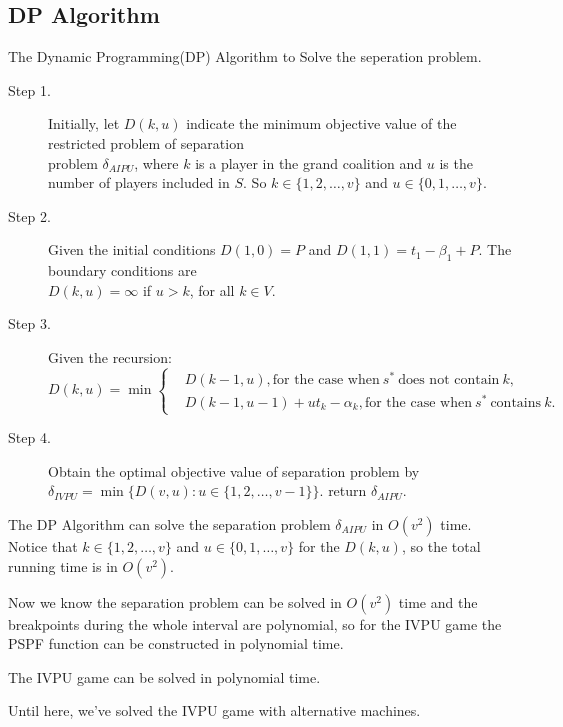 \subsection{DP Algorithm}

\begin{algorithm}[H]\label{algoDP}
\caption{The Dynamic Programming(DP) Algorithm to Solve the seperation problem.}
\begin{algorithmic}[1]

\begin{description}
  \item[Step 1.] Initially, let $D(k,u)$ indicate the minimum objective value of the restricted problem of separation \\
  \vspace{10pt}
  problem $\delta_{AIPU}$, where $k$ is a player in the grand coalition and $u$ is the number of players included in $S$. So $ k \in \{1,2,\ldots,v\}$ and $u\in \{0,1,\ldots,v\}$.

  \item[Step 2.] Given the initial conditions $D(1,0) = P$ and $D(1,1) = t_1 - \beta_1 +P$. The boundary conditions are \\
  \vspace{10pt}
  $D(k,u) = \infty$ if $u > k$, for all $k \in V$.
  \item[Step 3.] Given the recursion:
  \begin{equation*}
  D(k,u)= \min \left\{
  \begin{aligned}
  & D(k-1,u), \text{for the case when} \ s^* \ \text{does not contain} \ k, \\
  & D(k-1,u-1) + u t_k - \alpha_k ,\text{for the case when} \ s^* \ \text{contains} \ k.
  \end{aligned}
  \right.
  \end{equation*}

  \item[Step 4.] Obtain the optimal objective value of separation problem by
  $\delta_{IVPU} = \min\{D(v,u): u\in \{1,2,\ldots,v-1\}\}$.
   return $\delta_{AIPU}$.
\end{description}

\end{algorithmic}
\end{algorithm}

{The DP Algorithm can solve the separation problem $\delta_{AIPU}$ in $O(v^2)$ time.}
Notice that $k \in \{1,2,\ldots,v\}$ and $u\in \{0,1,\ldots,v\}$ for the $D(k,u)$, so the total running time is in $O(v^2)$.

Now we know the separation problem can be solved in $O(v^2)$ time and the breakpoints during the whole interval are polynomial, so for the IVPU game the PSPF function can be constructed in polynomial time.

\begin{thm}\label{thm6}
The IVPU game can be solved in polynomial time.
\end{thm}

Until here, we've solved the IVPU game with alternative machines.
